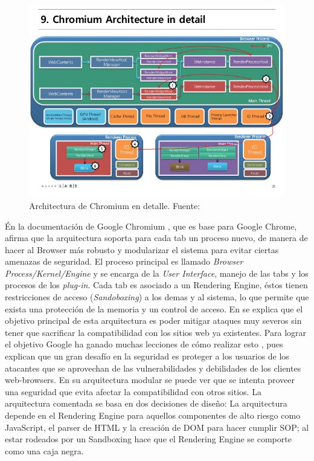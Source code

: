     \begin{figure}[h!t]
	    \centering
	    \includegraphics[scale=0.5]{figures/chromium-rendering-pipeline-28-638.jpg}
        \caption{Architectura de Chromium en detalle. Fuente: \cite{ChrRenderPipe}}
        \label{fig:archGC2}
    \end{figure}

    Én la documentación de Google Chromium \cite{multiProcGC}, que es base para Google Chrome, afirma que la arquitectura soporta para cada tab un proceso nuevo, de manera de hacer al Browser más robusto y modularizar el sistema para evitar ciertas amenazas de seguridad. El proceso principal es llamado \textit{Browser Process/Kernel/Engine} y se encarga de la \textit{User Interface}, manejo de las tabs y los procesos de los \textit{plug-in}. Cada tab es asociado a un Rendering Engine, éstos tienen restricciones de acceso (\textit{Sandoboxing}) a los demas y al sistema, lo que permite que exista una protección de la memoria y un control de acceso. En \cite{barth2008security} se explica que el objetivo principal de esta arquitectura es poder mitigar ataques muy severos sin tener que sacrificar la compatibilidad con los sitios web ya existentes. Para lograr el objetivo Google ha ganado muchas lecciones de cómo realizar esto \cite{reis2009browser}, pues explican que un gran desafío en la seguridad es proteger a los usuarios de los atacantes que se aprovechan de las vulnerabilidades y debilidades de los clientes web-browsers. En su arquitectura modular se puede ver que se intenta proveer una seguridad que evita afectar la compatibilidad con otros sitios. La arquitectura comentada se basa en dos decisiones de diseño: La arquitectura depende en el Rendering Engine para aquellos componentes de alto riesgo como JavaScript, el parser de HTML y la creación de DOM para hacer cumplir SOP; al estar rodeados por un Sandboxing hace que el Rendering Engine se comporte como una caja negra. 


